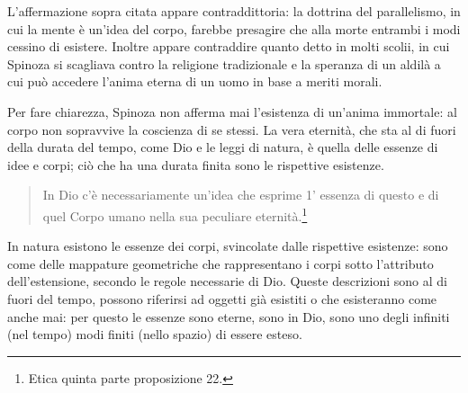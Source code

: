  L'affermazione sopra citata appare contraddittoria: la dottrina del parallelismo, in cui la mente è un'idea del corpo, farebbe presagire che alla morte entrambi i modi cessino di esistere. Inoltre appare contraddire quanto detto in molti scolii, in cui Spinoza si scagliava contro la religione tradizionale e la speranza di un aldilà a cui può accedere l'anima eterna di un uomo in base a meriti morali.

Per fare chiarezza, Spinoza non afferma mai l'esistenza di un'anima immortale: al corpo non sopravvive la coscienza di se stessi. La vera eternità, che sta al di fuori della durata del tempo, come Dio e le leggi di natura, è quella delle essenze di idee e corpi; ciò che ha una durata finita sono le rispettive esistenze.

\begin{quotation}
	\small In Dio c’è necessariamente un’idea che esprime 1’ essenza di questo e di quel Corpo umano nella sua peculiare eternità.\footnote{Etica quinta parte proposizione 22.}
\end{quotation}

In natura esistono le essenze dei corpi, svincolate dalle rispettive esistenze: sono come delle mappature geometriche che rappresentano i corpi sotto l'attributo dell'estensione, secondo le regole necessarie di Dio. Queste descrizioni sono al di fuori del tempo, possono riferirsi ad oggetti già esistiti o che esisteranno come anche mai: per questo le essenze sono eterne, sono in Dio, sono uno degli infiniti (nel tempo) modi finiti (nello spazio) di essere esteso.

